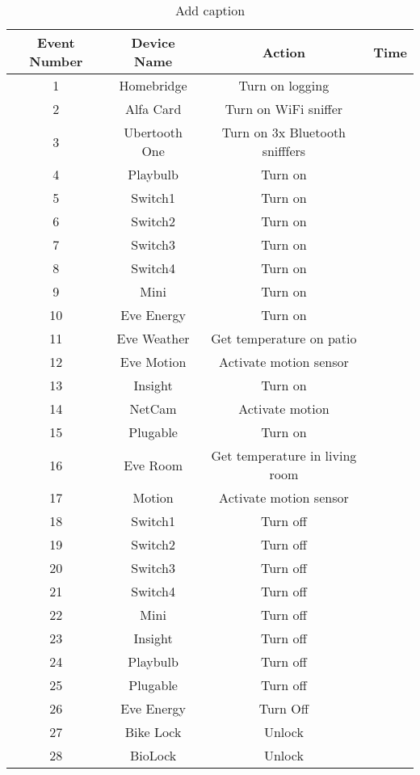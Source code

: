 \begin{table}[h!]
\centering
\caption{Add caption}
	\color{red}
	\begin{tabular}{|c|c|c|c|}
		\hline
		﻿Event Number & Device Name & Action & Time \\
		\hline
		1 & Homebridge & Turn on logging &  \\
		\hline
		2 & Alfa Card & Turn on WiFi sniffer &  \\
		\hline
		3 & Ubertooth One & Turn on 3x Bluetooth snifffers &  \\
		\hline
		4 & Playbulb & Turn on &  \\
		\hline
		5 & Switch1 & Turn on &  \\
		\hline
		6 & Switch2 & Turn on &  \\
		\hline
		7 & Switch3 & Turn on &  \\
		\hline
		8 & Switch4 & Turn on &  \\
		\hline
		9 & Mini & Turn on &  \\
		\hline
		10 & Eve Energy & Turn on &  \\
		\hline
		11 & Eve Weather & Get temperature on patio &  \\
		\hline
		12 & Eve Motion & Activate motion sensor &  \\
		\hline
		13 & Insight & Turn on &  \\
		\hline
		14 & NetCam & Activate motion &  \\
		\hline
		15 & Plugable & Turn on &  \\
		\hline
		16 & Eve Room & Get temperature in living room &  \\
		\hline
		17 & Motion & Activate motion sensor &  \\
		\hline
		18 & Switch1 & Turn off &  \\
		\hline
		19 & Switch2 & Turn off &  \\
		\hline
		20 & Switch3 & Turn off &  \\
		\hline
		21 & Switch4 & Turn off &  \\
		\hline
		22 & Mini & Turn off &  \\
		\hline
		23 & Insight & Turn off &  \\
		\hline
		24 & Playbulb & Turn off &  \\
		\hline
		25 & Plugable & Turn off &  \\
		\hline
		26 & Eve Energy & Turn Off &  \\
		\hline
		27 & Bike Lock & Unlock &  \\
		\hline
		28 & BioLock & Unlock &  \\

\end{tabular}
\end{table}
